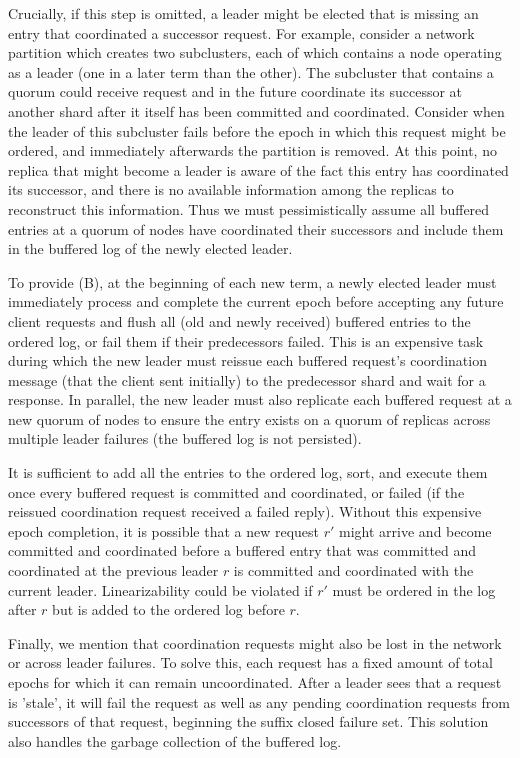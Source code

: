 Crucially, if this step is omitted, a leader might be elected that is missing an entry that coordinated a successor request. For example, consider a network partition which creates two subclusters, each of which contains a node operating as a leader (one in a later term than the other). The subcluster that contains a quorum could receive request and in the future coordinate its successor at another shard after it itself has been committed and coordinated. Consider when the leader of this subcluster fails before the epoch in which this request might be ordered, and immediately afterwards the partition is removed. At this point, no replica that might become a leader is aware of the fact this entry has coordinated its successor, and there is no available information among the replicas to reconstruct this information. Thus we must pessimistically assume all buffered entries at a quorum of nodes have coordinated their successors and include them in the buffered log of the newly elected leader.

To provide (B), at the beginning of each new term, a newly elected leader must immediately process and complete the current epoch before accepting any future client requests and flush all (old and newly received) buffered entries to the ordered log, or fail them if their predecessors failed. This is an expensive task during which the new leader must reissue each buffered request's coordination message (that the client sent initially) to the predecessor shard and wait for a response. In parallel, the new leader must also replicate each buffered request at a new quorum of nodes to ensure the entry exists on a quorum of replicas across multiple leader failures (the buffered log is not persisted). 

It is sufficient to add all the entries to the ordered log, sort, and execute them once every buffered request is committed and coordinated, or failed (if the reissued coordination request received a failed reply). Without this expensive epoch completion, it is possible that a new request $r'$ might arrive and become committed and coordinated before a buffered entry that was committed and coordinated at the previous leader $r$ is committed and coordinated with the current leader. Linearizability could be violated if $r'$ must be ordered in the log after $r$ but is added to the ordered log before $r$.

Finally, we mention that coordination requests might also be lost in the network or across leader failures. To solve this, each request has a fixed amount of total epochs for which it can remain uncoordinated. After a leader sees that a request is 'stale', it will fail the request as well as any pending coordination requests from successors of that request, beginning the suffix closed failure set. This solution also handles the garbage collection of the buffered log.

